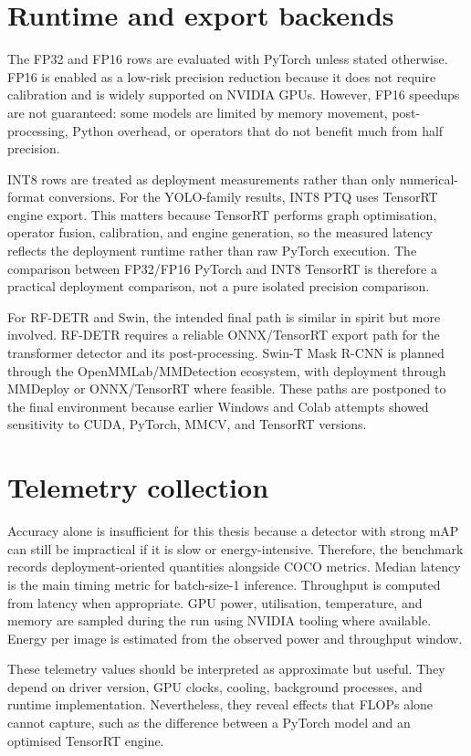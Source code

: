 \documentclass[a4paper,11pt,twoside]{report}
\theoremstyle{definition}
\begin{document}
\section{Runtime and export backends}

The FP32 and FP16 rows are evaluated with PyTorch unless stated otherwise. FP16 is enabled as a low-risk precision reduction because it does not require calibration and is widely supported on NVIDIA GPUs. However, FP16 speedups are not guaranteed: some models are limited by memory movement, post-processing, Python overhead, or operators that do not benefit much from half precision.

INT8 rows are treated as deployment measurements rather than only numerical-format conversions. For the YOLO-family results, INT8 PTQ uses TensorRT engine export. This matters because TensorRT performs graph optimisation, operator fusion, calibration, and engine generation, so the measured latency reflects the deployment runtime rather than raw PyTorch execution. The comparison between FP32/FP16 PyTorch and INT8 TensorRT is therefore a practical deployment comparison, not a pure isolated precision comparison.

For RF-DETR and Swin, the intended final path is similar in spirit but more involved. RF-DETR requires a reliable ONNX/TensorRT export path for the transformer detector and its post-processing. Swin-T Mask R-CNN is planned through the OpenMMLab/MMDetection ecosystem, with deployment through MMDeploy or ONNX/TensorRT where feasible. These paths are postponed to the final environment because earlier Windows and Colab attempts showed sensitivity to CUDA, PyTorch, MMCV, and TensorRT versions.

\section{Telemetry collection}

Accuracy alone is insufficient for this thesis because a detector with strong mAP can still be impractical if it is slow or energy-intensive. Therefore, the benchmark records deployment-oriented quantities alongside COCO metrics. Median latency is the main timing metric for batch-size-1 inference. Throughput is computed from latency when appropriate. GPU power, utilisation, temperature, and memory are sampled during the run using NVIDIA tooling where available. Energy per image is estimated from the observed power and throughput window.

These telemetry values should be interpreted as approximate but useful. They depend on driver version, GPU clocks, cooling, background processes, and runtime implementation. Nevertheless, they reveal effects that FLOPs alone cannot capture, such as the difference between a PyTorch model and an optimised TensorRT engine.
\end{document}
